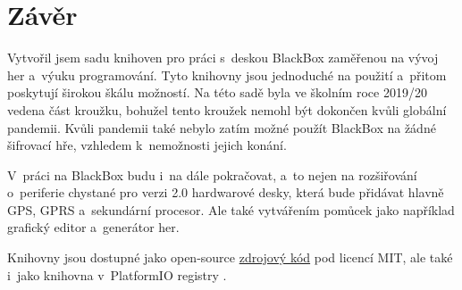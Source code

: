 \chapter{Závěr}

Vytvořil jsem sadu knihoven pro práci s~deskou BlackBox zaměřenou na vývoj her a~výuku programování. %
Tyto knihovny jsou jednoduché na použití a~přitom poskytují širokou škálu možností.
Na této sadě byla ve školním roce 2019/20 vedena část kroužku, bohužel tento kroužek nemohl být dokončen kvůli globální pandemii.
Kvůli pandemii také nebylo zatím možné použít BlackBox na žádné šifrovací hře, vzhledem k~nemožnosti jejich konání.

V~práci na BlackBox budu i~na dále pokračovat, a~to nejen na rozšiřování o~periferie chystané pro verzi 2.0 hardwarové desky, která bude přidávat hlavně GPS, GPRS a~sekundární procesor.
Ale také vytvářením pomůcek jako například grafický editor a~generátor her.

Knihovny jsou dostupné jako open-source \href{https://github.com/RoboticsBrno/BlackBox_library}{zdrojový kód} pod licencí MIT, ale také i~jako knihovna v~PlatformIO registry \cite{pio-registry}.